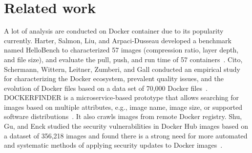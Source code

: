 \section{Related work}
\label{sec:related}

A lot of analysis are conducted on Docker container due to its popularity currently. 
Harter, Salmon, Liu, and Arpaci-Dusseau developed a benchmark named HelloBench to characterized 57 images (compression ratio, layer depth, and file size), and evaluate the pull, push, and run time of 57 containers~\cite{slacker}.
Cito, Schermann, Wittern, Leitner, Zumberi, and Gall conducted an empirical study for characterizing the Docker ecosystem, prevalent quality issues, and the evolution of Docker files based on a data set of 70,000 Docker files~\cite{dockervulnerabile}.
DOCKERFINDER is a microservice-based prototype that allows searching for images based on multiple attributes, e.g., image name, image size, or supported software distributions~\cite{dockerfinder}. It also crawls images from remote Docker registry.
Shu, Gu, and Enck studied the security vulnerabilities in Docker Hub images based on a dataset of 356,218 images and found there is a strong need for more automated and systematic methods of applying security updates to Docker images~\cite{analysisdockergithub}.
%

